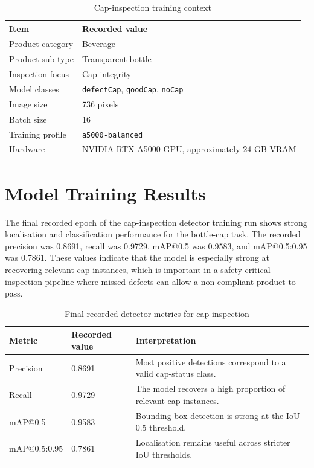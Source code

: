 \documentclass[12pt,a4paper]{report}
\begin{document}
\begin{table}[h!]
\centering
\caption{Cap-inspection training context}
\label{tab:cap-training-context}
\begin{tabularx}{\textwidth}{|P{4cm}|Y|}
\hline
\textbf{Item} & \textbf{Recorded value} \\
\hline
Product category & Beverage \\
\hline
Product sub-type & Transparent bottle \\
\hline
Inspection focus & Cap integrity \\
\hline
Model classes & \texttt{defectCap}, \texttt{goodCap}, \texttt{noCap} \\
\hline
Image size & 736 pixels \\
\hline
Batch size & 16 \\
\hline
Training profile & \texttt{a5000-balanced} \\
\hline
Hardware & NVIDIA RTX A5000 GPU, approximately 24 GB VRAM \\
\hline
\end{tabularx}
\end{table}

\section{Model Training Results}
\label{sec:model-training-results}

The final recorded epoch of the cap-inspection detector training run shows strong localisation and classification performance for the bottle-cap task. The recorded precision was 0.8691, recall was 0.9729, mAP@0.5 was 0.9583, and mAP@0.5:0.95 was 0.7861. These values indicate that the model is especially strong at recovering relevant cap instances, which is important in a safety-critical inspection pipeline where missed defects can allow a non-compliant product to pass.

\begin{table}[h!]
\centering
\caption{Final recorded detector metrics for cap inspection}
\label{tab:cap-detector-metrics}
\begin{tabularx}{\textwidth}{|P{4cm}|P{4cm}|Y|}
\hline
\textbf{Metric} & \textbf{Recorded value} & \textbf{Interpretation} \\
\hline
Precision & 0.8691 & Most positive detections correspond to a valid cap-status class. \\
\hline
Recall & 0.9729 & The model recovers a high proportion of relevant cap instances. \\
\hline
mAP@0.5 & 0.9583 & Bounding-box detection is strong at the IoU 0.5 threshold. \\
\hline
mAP@0.5:0.95 & 0.7861 & Localisation remains useful across stricter IoU thresholds. \\
\hline
\end{tabularx}
\end{table}
\end{document}
